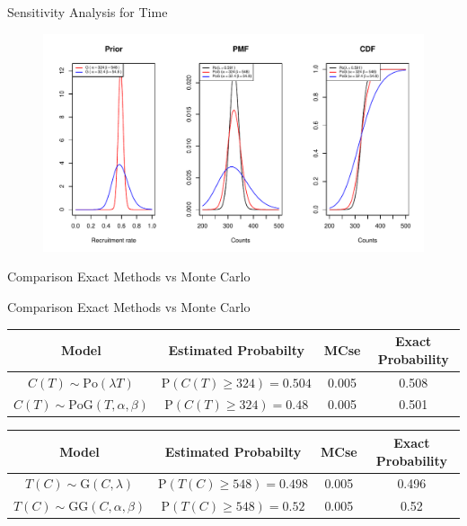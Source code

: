 \documentclass[english]{beamer}\usepackage[]{graphicx}\usepackage[]{xcolor}
\makeatletter
\def\maxwidth{ %
  \ifdim\Gin@nat@width>\linewidth
    \linewidth
  \else
    \Gin@nat@width
  \fi
}
\newenvironment{knitrout}{}{} %
\makeatother
\begin{document}
\begin{frame}{Sensitivity Analysis for Time}

\begin{figure}
\centering
\begin{knitrout}
\color{fgcolor}
\includegraphics[width=\maxwidth]{figures/figunnamed-chunk-12-1} 
\end{knitrout}
\end{figure}
\end{frame}

\begin{frame}{Comparison Exact Methods vs Monte Carlo}

\end{frame}


\begin{frame}[shrink=20]{Comparison Exact Methods vs Monte Carlo}

\begin{table}[h!]
\centering
\begin{tabular}{cccc}
 \textbf{Model} & \textbf{Estimated Probabilty} & \textbf{MCse} & \textbf{Exact Probability} \\
\hline
\hline
 $C(T)\sim\textrm{Po}(\lambda T)$ & $\textrm{P}(C(T)\geq 324) = 0.504$ & 0.005 & 0.508 \\
 $C(T)\sim\textrm{PoG}(T, \alpha, \beta)$ & $\textrm{P}(C(T)\geq 324) = 0.48$ & 0.005 & 0.501 
\end{tabular}
\end{table}

\begin{table}[h!]
\centering
\begin{tabular}{cccc}
 \textbf{Model} & \textbf{Estimated Probabilty} & \textbf{MCse} & \textbf{Exact Probability} \\
\hline
\hline
 $T(C)\sim\textrm{G}(C, \lambda)$& $\textrm{P}(T(C)\geq 548) = 0.498$ & 0.005 & 0.496\\
$T(C)\sim\textrm{GG}(C, \alpha, \beta)$ & $\textrm{P}(T(C)\geq 548) = 0.52$ & 0.005 & 0.52
\end{tabular}
\end{table}

\end{frame}
\end{document}
